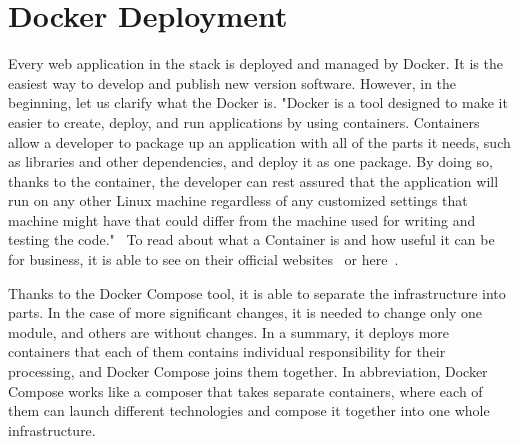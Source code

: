 \section{Docker Deployment}\label{sec:docker-deployment}
Every web application in the stack is deployed and managed by Docker.
It is the easiest way to develop and publish new version software.
However, in the beginning, let us clarify what the Docker is.
"Docker is a tool designed to make it easier to create, deploy, and run applications by using containers.
Containers allow a developer to package up an application with all of the parts it needs, such as libraries and other dependencies, and deploy it as one package.
By doing so, thanks to the container, the developer can rest assured that the application will run on any other Linux machine regardless of any customized settings that machine might have that could differ from the machine used for writing and testing the code."~\cite{dockerDescription}
To read about what a Container is and how useful it can be for business, it is able to see on their official websites~\cite{dockerContainer} or here~\cite{dockerDescription}.

Thanks to the Docker Compose tool, it is able to separate the infrastructure into parts.
In the case of more significant changes, it is needed to change only one module, and others are without changes.
In a summary, it deploys more containers that each of them contains individual responsibility for their processing, and Docker Compose joins them together.
In abbreviation, Docker Compose works like a composer that takes separate containers, where each of them can launch different technologies and compose it together into one whole infrastructure.~\cite{dockerCompose}
